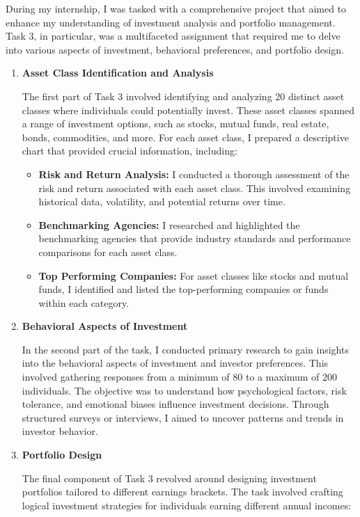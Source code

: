 During my internship, I was tasked with a comprehensive project that aimed to enhance my understanding of investment analysis and portfolio management. Task 3, in particular, was a multifaceted assignment that required me to delve into various aspects of investment, behavioral preferences, and portfolio design.
\begin{enumerate}

    \item  \textbf{Asset Class Identification and Analysis}

The first part of Task 3 involved identifying and analyzing 20 distinct asset classes where individuals could potentially invest. These asset classes spanned a range of investment options, such as stocks, mutual funds, real estate, bonds, commodities, and more. For each asset class, I prepared a descriptive chart that provided crucial information, including:

\begin{itemize}
    \item \textbf{Risk and Return Analysis:} I conducted a thorough assessment of the risk and return associated with each asset class. This involved examining historical data, volatility, and potential returns over time.
    \item \textbf{Benchmarking Agencies:} I researched and highlighted the benchmarking agencies that provide industry standards and performance comparisons for each asset class.
    \item \textbf{Top Performing Companies:} For asset classes like stocks and mutual funds, I identified and listed the top-performing companies or funds within each category.
\end{itemize}

\item  \textbf{Behavioral Aspects of Investment}

In the second part of the task, I conducted primary research to gain insights into the behavioral aspects of investment and investor preferences. This involved gathering responses from a minimum of 80 to a maximum of 200 individuals. The objective was to understand how psychological factors, risk tolerance, and emotional biases influence investment decisions. Through structured surveys or interviews, I aimed to uncover patterns and trends in investor behavior.

\item  \textbf{Portfolio Design}

The final component of Task 3 revolved around designing investment portfolios tailored to different earnings brackets. The task involved crafting logical investment strategies for individuals earning different annual incomes:


\end{enumerate}
